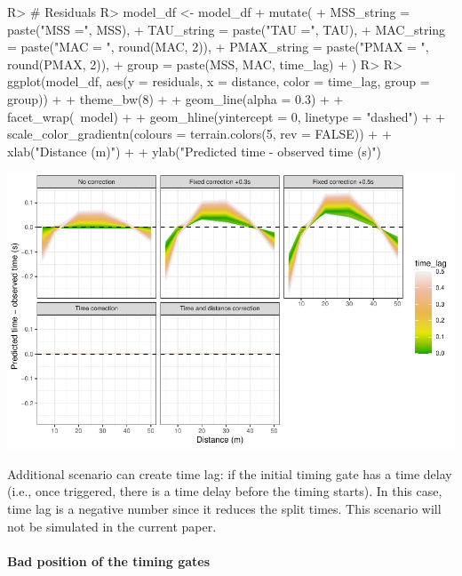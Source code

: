 \documentclass[
]{jss}
\begin{document}
\begin{CodeChunk}
\begin{CodeInput}
R> # Residuals
R> model_df <- model_df %
+   mutate(
+     MSS_string = paste("MSS =", MSS),
+     TAU_string = paste("TAU =", TAU),
+     MAC_string = paste("MAC = ", round(MAC, 2)),
+     PMAX_string = paste("PMAX = ", round(PMAX, 2)),
+     group = paste(MSS, MAC, time_lag)
+   )
R> 
R> ggplot(model_df, aes(y = residuals, x = distance, color = time_lag, group = group)) +
+   theme_bw(8) +
+   geom_line(alpha = 0.3) +
+   facet_wrap(~model) +
+   geom_hline(yintercept = 0, linetype = "dashed") +
+   scale_color_gradientn(colours = terrain.colors(5, rev = FALSE)) +
+   xlab("Distance (m)") +
+   ylab("Predicted time - observed time (s)")
\end{CodeInput}


\begin{center}\includegraphics[width=1\linewidth]{paper_files/figure-latex/unnamed-chunk-47-1} \end{center}

\end{CodeChunk}

Additional scenario can create time lag: if the initial timing gate has a time delay (i.e., once triggered, there is a time delay before the timing starts). In this case, time lag is a negative number since it reduces the split times. This scenario will not be simulated in the current paper.

\hypertarget{bad-position-of-the-timing-gates}{%
\paragraph{Bad position of the timing gates}\label{bad-position-of-the-timing-gates}}
\end{document}
